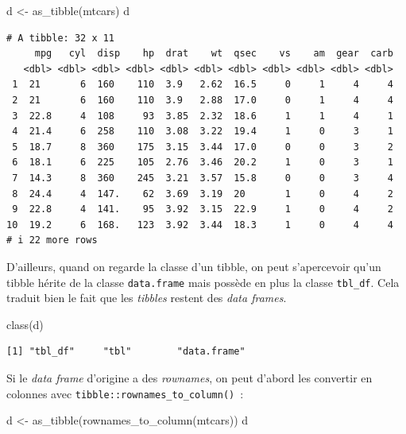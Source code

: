\documentclass[
  letterpaper,
  DIV=11,
  numbers=noendperiod,
  oneside]{scrreprt}
\newenvironment{Shaded}{\begin{snugshade}}{\end{snugshade}}
\newcommand{\FunctionTok}[1]{\textcolor[rgb]{0.28,0.35,0.67}{#1}}
\newcommand{\NormalTok}[1]{\textcolor[rgb]{0.00,0.23,0.31}{#1}}
\newcommand{\OtherTok}[1]{\textcolor[rgb]{0.00,0.23,0.31}{#1}}
\begin{document}
\begin{Shaded}
\begin{Highlighting}[]
\NormalTok{d }\OtherTok{\textless{}{-}} \FunctionTok{as\_tibble}\NormalTok{(mtcars)}
\NormalTok{d}
\end{Highlighting}
\end{Shaded}

\begin{verbatim}
# A tibble: 32 x 11
     mpg   cyl  disp    hp  drat    wt  qsec    vs    am  gear  carb
   <dbl> <dbl> <dbl> <dbl> <dbl> <dbl> <dbl> <dbl> <dbl> <dbl> <dbl>
 1  21       6  160    110  3.9   2.62  16.5     0     1     4     4
 2  21       6  160    110  3.9   2.88  17.0     0     1     4     4
 3  22.8     4  108     93  3.85  2.32  18.6     1     1     4     1
 4  21.4     6  258    110  3.08  3.22  19.4     1     0     3     1
 5  18.7     8  360    175  3.15  3.44  17.0     0     0     3     2
 6  18.1     6  225    105  2.76  3.46  20.2     1     0     3     1
 7  14.3     8  360    245  3.21  3.57  15.8     0     0     3     4
 8  24.4     4  147.    62  3.69  3.19  20       1     0     4     2
 9  22.8     4  141.    95  3.92  3.15  22.9     1     0     4     2
10  19.2     6  168.   123  3.92  3.44  18.3     1     0     4     4
# i 22 more rows
\end{verbatim}

D'ailleurs, quand on regarde la classe d'un tibble, on peut s'apercevoir
qu'un tibble hérite de la classe \texttt{data.frame} mais possède en
plus la classe \texttt{tbl\_df}. Cela traduit bien le fait que les
\emph{tibbles} restent des \emph{data frames}.

\begin{Shaded}
\begin{Highlighting}[]
\FunctionTok{class}\NormalTok{(d)}
\end{Highlighting}
\end{Shaded}

\begin{verbatim}
[1] "tbl_df"     "tbl"        "data.frame"
\end{verbatim}

Si le \emph{data frame} d'origine a des \emph{rownames}, on peut d'abord
les convertir en colonnes avec \texttt{tibble::rownames\_to\_column()}~:

\begin{Shaded}
\begin{Highlighting}[]
\NormalTok{d }\OtherTok{\textless{}{-}} \FunctionTok{as\_tibble}\NormalTok{(}\FunctionTok{rownames\_to\_column}\NormalTok{(mtcars))}
\NormalTok{d}
\end{Highlighting}
\end{Shaded}
\end{document}
